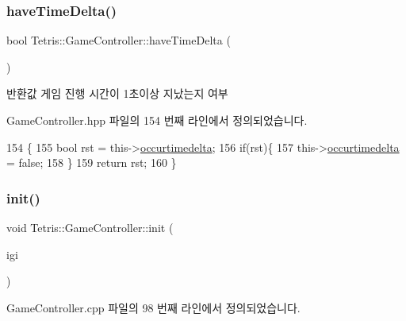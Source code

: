 \subsubsection{\texorpdfstring{have\+Time\+Delta()}{haveTimeDelta()}}
{\footnotesize\ttfamily bool Tetris\+::\+Game\+Controller\+::have\+Time\+Delta (\begin{DoxyParamCaption}{ }\end{DoxyParamCaption})\hspace{0.3cm}{\ttfamily [inline]}}

\begin{DoxyReturn}{반환값}
게임 진행 시간이 1초이상 지났는지 여부 
\end{DoxyReturn}


Game\+Controller.\+hpp 파일의 154 번째 라인에서 정의되었습니다.


\begin{DoxyCode}
154                                 \{
155                 \textcolor{keywordtype}{bool} rst = this->\hyperlink{class_tetris_1_1_game_controller_ac98e5fa60bd5bc9bb2e2c5210148f2cc}{occurtimedelta};
156                 \textcolor{keywordflow}{if}(rst)\{
157                 this->\hyperlink{class_tetris_1_1_game_controller_ac98e5fa60bd5bc9bb2e2c5210148f2cc}{occurtimedelta} = \textcolor{keyword}{false};
158                 \}
159                 \textcolor{keywordflow}{return} rst;
160             \}
\end{DoxyCode}
\mbox{\label{class_tetris_1_1_game_controller_a9c0f88f11b8b75063e63bcbc621dc0be}} 
\subsubsection{\texorpdfstring{init()}{init()}\hspace{0.1cm}{\footnotesize\ttfamily [1/2]}}
{\footnotesize\ttfamily void Tetris\+::\+Game\+Controller\+::init (\begin{DoxyParamCaption}\item[{\hyperlink{class_tetris_1_1_init_game_info}{Init\+Game\+Info} $\ast$}]{igi }\end{DoxyParamCaption})}



Game\+Controller.\+cpp 파일의 98 번째 라인에서 정의되었습니다.



